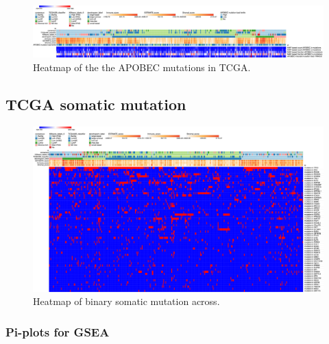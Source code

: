 \begin{appendices}
\begin{figure}[!htb]   
\centering
\includegraphics[width=1.0\textwidth,height=1.0\textheight,keepaspectratio]{Sections/Network_I/Resources/selective_pruning/sel_tfs_apobec_meta.png}
  \caption{Heatmap of the the APOBEC mutations in TCGA.}
\label{fig:ap:sel_tfs_tcga_meta_apobec}
\end{figure}

\newpage 

\subsection{TCGA somatic mutation}

\begin{figure}[!htb]   
\centering
\includegraphics[width=1.0\textwidth,height=1.0\textheight,keepaspectratio]{Sections/Network_I/Resources/selective_pruning/sel_tfs_mut_meta.png}
  \caption{Heatmap of binary somatic mutation across.}
\label{fig:ap:sel_tfs_tcga_meta_mut}
\end{figure}

\newpage

\subsubsection{Pi-plots for GSEA} \label{s:ap:sel_prun_pi}



\end{appendices}
